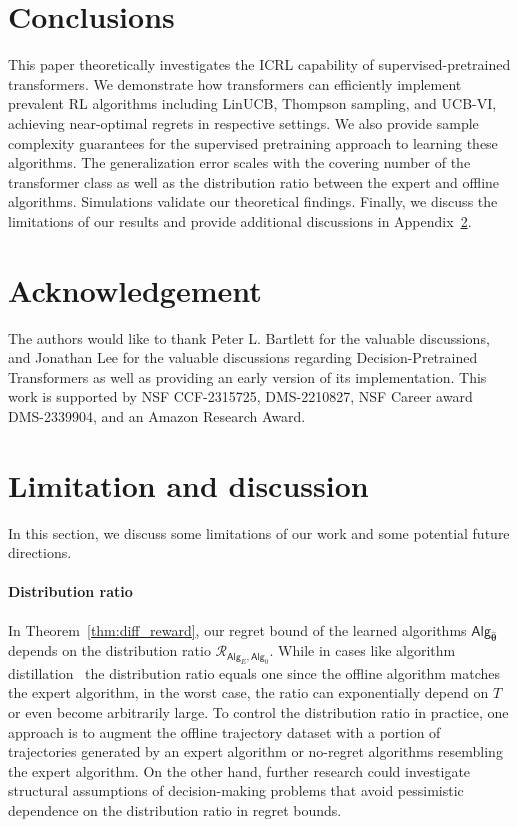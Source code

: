 \documentclass[10pt]{article}
\newcommand{\<}{\left\langle}
\renewcommand{\>}{\right\rangle}
\newcommand{\totlen}{{T}}
\newcommand{\sAlg}{{\mathsf{Alg}}}
\newcommand{\esttfpar}{{\widehat{\btheta}}}
\newcommand{\shortexp}{{E}}
\newcommand{\distratio}{{\mathcal{R}}}
\def\btheta{{\boldsymbol \theta}}
\begin{document}
\section{Conclusions}

This paper theoretically investigates the ICRL capability of supervised-pretrained transformers. We demonstrate how transformers can efficiently implement prevalent RL algorithms including LinUCB, Thompson sampling, and UCB-VI, achieving near-optimal regrets in respective settings. We also provide sample complexity guarantees for the supervised pretraining approach to learning these algorithms. The generalization error scales with the covering number of the transformer class as well as the distribution ratio between the expert and offline algorithms. Simulations validate our theoretical findings.  
Finally, we discuss the limitations of our results and provide additional discussions in Appendix~\ref{sec:limitation}.





\section*{Acknowledgement}

The authors would like to thank Peter L. Bartlett for the valuable discussions, and Jonathan Lee for the valuable discussions regarding Decision-Pretrained Transformers as well as providing an early version of its implementation. This work is supported by NSF CCF-2315725, DMS-2210827, NSF Career award DMS-2339904, and an Amazon Research Award.





\clearpage
\appendix 
\tableofcontents
\clearpage





\section{Limitation and discussion}
\label{sec:limitation}
In this section, we discuss some limitations of our work and some potential future directions. 

\paragraph{Distribution ratio} In Theorem~\ref{thm:diff_reward}, our regret bound of the learned algorithms $\sAlg_{\esttfpar}$ depends on the distribution ratio $\distratio_{\sAlg_{\shortexp},\sAlg_0}$. While in cases like algorithm distillation~\citep{laskin2022context} the distribution ratio equals one since the offline algorithm matches the expert algorithm, in the worst case, the ratio can exponentially depend on $\totlen$ or even become arbitrarily large. To control the distribution ratio in practice, one approach is to augment the offline trajectory dataset with a portion of trajectories generated by an expert algorithm or no-regret algorithms resembling the expert algorithm. On the other hand, further research could investigate structural assumptions of decision-making problems that avoid pessimistic dependence on the distribution ratio in regret bounds. 
\end{document}
